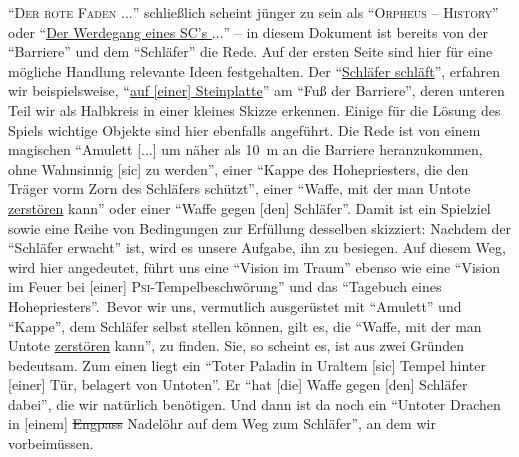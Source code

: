 \documentclass[a5paper,pagesize,numbers=noenddot]{scrbook}
\begin{document}
\enquote{\textsc{Der rote Faden $\ldots$}} schließlich scheint jünger zu sein als \enquote{\textsc{Orpheus -- History}} oder \enquote{\uline{Der Werdegang eines SC's $\ldots$}} -- in diesem Dokument ist bereits von der \enquote{Barriere} und dem \enquote{Schläfer} die Rede.
Auf der ersten Seite sind hier für eine mögliche Handlung relevante Ideen festgehalten.
Der \enquote{\uline{Schläfer schläft}}, erfahren wir beispielsweise, \enquote{\uline{auf [einer] Steinplatte}} am \enquote{Fuß der Barriere}, deren unteren Teil wir als Halbkreis in einer kleines Skizze erkennen.
Einige für die Lösung des Spiels wichtige Objekte sind hier ebenfalls angeführt.
Die Rede ist von einem magischen \enquote{Amulett [$\ldots$] um näher als 10~m an die Barriere heranzukommen, ohne Wahnsinnig [sic] zu werden}, einer \enquote{Kappe des Hohepriesters, die den Träger vorm Zorn des Schläfers schützt}, einer \enquote{Waffe, mit der man Untote \uline{zerstören} kann} oder einer \enquote{Waffe gegen [den] Schläfer}.
Damit ist ein Spielziel sowie eine Reihe von Bedingungen zur Erfüllung desselben skizziert:
Nachdem der \enquote{Schläfer erwacht} ist, wird es unsere Aufgabe, ihn zu besiegen.
Auf diesem Weg, wird hier angedeutet, führt uns eine \enquote{Vision im Traum} ebenso wie eine \enquote{Vision im Feuer bei [einer] \textsc{Psi}-Tempelbeschwörung} und das \enquote{Tagebuch eines Hohepriesters}.\
Bevor wir uns, vermutlich ausgerüstet mit \enquote{Amulett} und \enquote{Kappe}, dem Schläfer selbst stellen können, gilt es, die \enquote{Waffe, mit der man Untote \uline{zerstören} kann}, zu finden.
Sie, so scheint es, ist aus zwei Gründen bedeutsam.
Zum einen liegt ein \enquote{Toter Paladin in Uraltem [sic] Tempel hinter [einer] Tür, belagert von Untoten}.
Er \enquote{hat [die] Waffe gegen [den] Schläfer dabei}, die wir natürlich benötigen.
Und dann ist da noch ein \enquote{Untoter Drachen in [einem] \sout{Engpass} Nadelöhr auf dem Weg zum Schläfer}, an dem wir vorbeimüssen.
\end{document}
